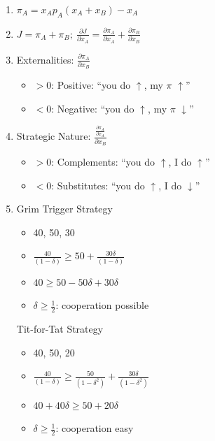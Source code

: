 \documentclass[11pt, english]{article}
\begin{document}
	\begin{enumerate}
	\setlength\itemsep{0cm}
		\item $\pi_A=x_Ap_A(x_A+x_B)-x_A$
		\item $J=\pi_A+\pi_B;\ \frac{\partial J}{\partial x_A}=\frac{\partial\pi_A}{\partial x_A}+\frac{\partial\pi_B}{\partial x_B}$
		\item Externalities: $\frac{\partial\pi_A}{\partial x_B}$
		\begin{itemize}
			\item $>0$: Positive: ``you do $\uparrow$, my $\pi$ $\uparrow$''
			\item $<0$: Negative: ``you do $\uparrow$, my $\pi$ $\downarrow$''
		\end{itemize}
		\item Strategic Nature: $\frac{\frac{\partial\pi_A}{\partial x_A}}{\partial x_B}$
		\begin{itemize}
			\item $>0$: Complements: ``you do $\uparrow$, I do $\uparrow$''
			\item $<0$: Substitutes: ``you do $\uparrow$, I do $\downarrow$''
		\end{itemize}
		\item Grim Trigger Strategy
		\begin{itemize}
			\item 40, 50, 30
			\item $\frac{40}{(1-\delta)}\ge50+\frac{30\delta}{(1-\delta)}$
			\item $40\ge50-50\delta+30\delta$
			\item $\delta\ge\frac{1}{2}$: cooperation possible
		\end{itemize}
		Tit-for-Tat Strategy
		\begin{itemize}
			\item 40, 50, 20
			\item $\frac{40}{(1-\delta)}\ge\frac{50}{(1-\delta^2)}+\frac{30\delta}{(1-\delta^2)}$
			\item $40+40\delta\ge50+20\delta$
			\item $\delta\ge\frac{1}{2}$: cooperation easy
		\end{itemize}
	\end{enumerate}
\end{document}
